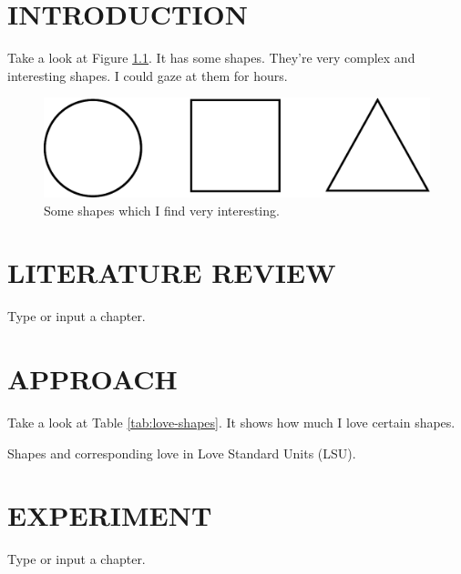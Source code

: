 \documentclass[dissertation]{uathesis}
\author{Joe Somebody}       %
\title{Title of the thesis: the top line should be the longest \and
  the middle one is second longest \and
  and the last is shortest}
\begin{document}
\makefrontmatter


\begin{body}

\chapter{INTRODUCTION}

Take a look at Figure \ref{fig:shapes}. It has some shapes. They're very
complex and interesting shapes. I could gaze at them for hours.

\begin{figure}
  \centering
  \includegraphics[width=5.0in]{fig/shapes.pdf}
  \caption{Some shapes which I find very interesting.}
  \label{fig:shapes}
\end{figure}

\chapter{LITERATURE REVIEW}
Type or input{} a chapter. \cite{rocket-themoon2167}

\chapter{APPROACH}
Take a look at Table \ref{tab:love-shapes}. It shows how much I love certain
shapes.

\begin{table}
  \centering
  
  \caption{Shapes and corresponding love in Love Standard Units (LSU).}
  \label{tab:love-shapes}
\end{table}

\chapter{EXPERIMENT}
Type or input{} a chapter. \cite{rocket-themoon2167}


\end{body}
\end{document}

